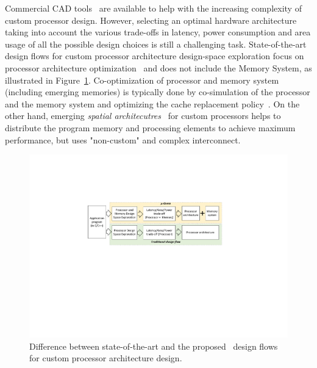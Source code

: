 Commercial CAD tools~\cite{synopsystool,tensilica,codasiptool} are available to help with the increasing complexity of custom processor design. However, selecting an optimal hardware architecture taking into account the various trade-offs in latency, power consumption and area usage of all the possible design choices is still a challenging task. State-of-the-art design flows for custom processor architecture design-space exploration focus on processor architecture optimization~\cite{Meloni2012,EusseSAMOS2014,Jozwiak2013,Karuri2009} and does not include the Memory System, as illustrated in Figure~\ref{fig:intro}. Co-optimization of processor and memory system (including emerging memories) is typically done by co-simulation of the processor and the memory system and optimizing the cache replacement policy~\cite{4798259,7092595,6271803,Mittal13f}. On the other hand, emerging \emph{spatial architecutres}~\cite{7284058,8686088} for custom processors helps to distribute the program memory and processing elements to achieve maximum performance, but uses "non-custom" and complex interconnect.

\begin{figure}[ht]
    \centering
    \includegraphics[clip, trim=6cm 10.5cm 6.4cm 5.2cm, width=1.0\linewidth]{images/intro_figure.pdf} %
    \caption{Difference between state-of-the-art and the proposed \frameworkname~design flows for custom processor architecture design.}
    \label{fig:intro}
\end{figure}

